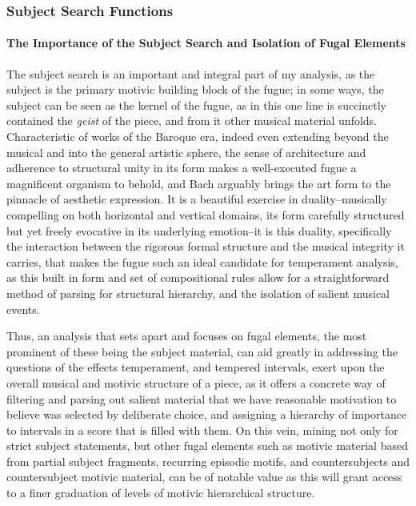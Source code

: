 \subsubsection{Subject Search Functions}\label{subject-search-functions}

\paragraph{The Importance of the Subject Search and Isolation of Fugal
Elements}\label{the-importance-of-the-subject-search-and-isolation-of-fugal-elements}

The subject search is an important and integral part of my analysis, as
the subject is the primary motivic building block of the fugue; in some
ways, the subject can be seen as the kernel of the fugue, as in this one
line is succinctly contained the \emph{geist} of the piece, and from it
other musical material unfolds. Characteristic of works of the Baroque
era, indeed even extending beyond the musical and into the general
artistic sphere, the sense of architecture and adherence to structural
unity in its form makes a well-executed fugue a magnificent organism to
behold, and Bach arguably brings the art form to the pinnacle of
aesthetic expression. It is a beautiful exercise in duality--musically
compelling on both horizontal and vertical domains, its form carefully
structured but yet freely evocative in its underlying emotion--it is
this duality, specifically the interaction between the rigorous formal
structure and the musical integrity it carries, that makes the fugue
such an ideal candidate for temperament analysis, as this built in form
and set of compositional rules allow for a straightforward method of
parsing for structural hierarchy, and the isolation of salient musical
events.

Thus, an analysis that sets apart and focuses on fugal elements, the
most prominent of these being the subject material, can aid greatly in
addressing the questions of the effects temperament, and tempered
intervals, exert upon the overall musical and motivic structure of a
piece, as it offers a concrete way of filtering and parsing out salient
material that we have reasonable motivation to believe was selected by
deliberate choice, and assigning a hierarchy of importance to intervals
in a score that is filled with them. On this vein, mining not only for
strict subject statements, but other fugal elements such as motivic
material based from partial subject fragments, recurring episodic
motifs, and countersubjects and countersubject motivic material, can be
of notable value as this will grant access to a finer graduation of
levels of motivic hierarchical structure.

